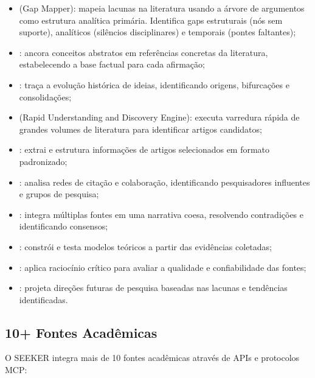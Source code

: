 \begin{itemize}
\item {} (Gap Mapper): mapeia lacunas na literatura
usando a árvore de argumentos como estrutura analítica primária.
Identifica gaps estruturais (nós sem suporte), analíticos (silêncios
disciplinares) e temporais (pontes faltantes);
\item {}: ancora conceitos abstratos em
referências concretas da literatura, estabelecendo a base factual
para cada afirmação;
\item {}: traça a evolução histórica de ideias,
identificando origens, bifurcações e consolidações;
\item {} (Rapid Understanding and Discovery Engine):
executa varredura rápida de grandes volumes de literatura para
identificar artigos candidatos;
\item {}: extrai e estrutura informações de artigos
selecionados em formato padronizado;
\item {}: analisa redes de citação e colaboração,
identificando pesquisadores influentes e grupos de pesquisa;
\item {}: integra múltiplas fontes em uma
narrativa coesa, resolvendo contradições e identificando consensos;
\item {}: constrói e testa modelos teóricos a
partir das evidências coletadas;
\item {}: aplica raciocínio crítico para avaliar
a qualidade e confiabilidade das fontes;
\item {}: projeta direções futuras de pesquisa
baseadas nas lacunas e tendências identificadas.
\end{itemize}

\subsection{10+ Fontes Acadêmicas}

O SEEKER integra mais de 10 fontes acadêmicas através de APIs e
protocolos MCP\@:

